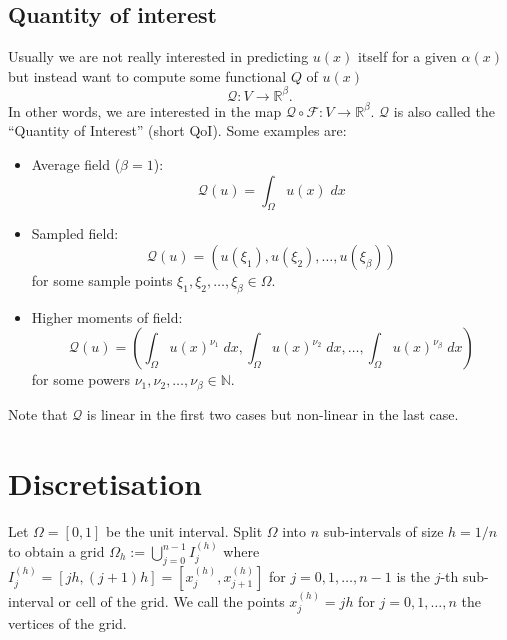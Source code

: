 \documentclass[11pt]{article}
\begin{document}
\subsection{Quantity of interest}
Usually we are not really interested in predicting $u(x)$ itself for a given $\alpha(x)$ but instead want to compute some functional $Q$ of $u(x)$
\begin{equation}
    \mathcal{Q}: V\rightarrow \mathbb{R}^\beta.\label{eqn:QoI}
\end{equation}
In other words, we are interested in the map $\mathcal{Q}\circ \mathcal{F}:V\rightarrow \mathbb{R}^\beta$. $\mathcal{Q}$ is also called the ``Quantity of Interest'' (short QoI). Some examples are:
\begin{itemize}
    \item Average field ($\beta=1$):
    \begin{equation}
        \mathcal{Q}(u) = \int_\Omega u(x)\;dx
    \end{equation}
    \item Sampled field:
    \begin{equation}
        \mathcal{Q}(u) = (u(\xi_1),u(\xi_2),\dots,u(\xi_\beta))
    \end{equation}
     for some sample points $\xi_1,\xi_2,\dots,\xi_\beta\in\Omega$.
    \item Higher moments of field:
    \begin{equation}
        \mathcal{Q}(u) = \left(\int_\Omega u(x)^{\nu_1}\;dx,\int_\Omega u(x)^{\nu_2}\;dx,\dots,\int_\Omega u(x)^{\nu_\beta}\;dx\right)
    \end{equation}
    for some powers $\nu_1,\nu_2,\dots,\nu_\beta\in\mathbb{N}$.
\end{itemize}
Note that $\mathcal{Q}$ is linear in the first two cases but non-linear in the last case.
\section{Discretisation}
Let $\Omega = [0,1]$ be the unit interval. Split $\Omega$ into $n$ sub-intervals of size $h=1/n$ to obtain a grid \mbox{$\Omega_h := \bigcup_{j=0}^{n-1} I_j^{(h)}$} where $I_j^{(h)}=[jh,(j+1)h]=[x^{(h)}_j,x^{(h)}_{j+1}]$ for $j=0,1,\dots,n-1$ is the $j$-th sub-interval or cell of the grid. We call the points $x^{(h)}_j=jh$ for $j=0,1,\dots,n$ the vertices of the grid.
\end{document}
